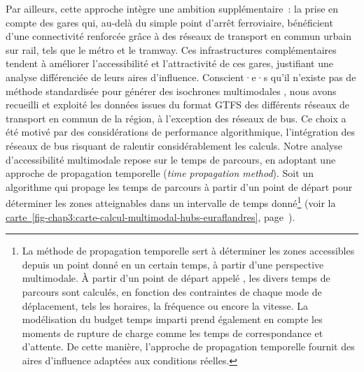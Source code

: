 \begin{refsegment}
Par ailleurs, cette approche intègre une ambition supplémentaire~: la prise en compte des gares qui, au-delà du simple point d'arrêt ferroviaire, bénéficient d’une connectivité renforcée grâce à des réseaux de transport en commun urbain sur rail, tels que le métro et le tramway. Ces infrastructures complémentaires tendent à améliorer l’accessibilité et l’attractivité de ces gares, justifiant une analyse différenciée de leurs aires d’influence. Conscient·e·s qu’il n’existe pas de méthode standardisée pour générer des isochrones multimodales \textcolor{blue}{\autocite[5]{krismer_enhancing_2017}}, nous avons recueilli et exploité les données issues du format \acrfull{GTFS} des différents réseaux de transport en commun de la région, à l’exception des réseaux de bus. Ce choix a été motivé par des considérations de performance algorithmique, l’intégration des réseaux de bus risquant de ralentir considérablement les calculs. Notre analyse d’accessibilité multimodale repose sur le temps de parcours, en adoptant une approche de propagation temporelle (\textsl{time propagation method}). Soit un algorithme qui propage les temps de parcours à partir d’un point de départ pour déterminer les zones atteignables dans un intervalle de temps donné\footnote{
    La méthode de propagation temporelle sert à déterminer les zones accessibles depuis un point donné en un certain temps, à partir d'une perspective multimodale. À partir d'un point de départ appelé , les divers temps de parcours sont calculés, en fonction des contraintes de chaque mode de déplacement, tels les horaires, la fréquence ou encore la vitesse. La modélisation du budget temps imparti prend également en compte les moments de rupture de charge comme les temps de correspondance et d'attente. De cette manière, l'approche de propagation temporelle fournit des aires d'influence adaptées aux conditions réelles.
} (voir la \hyperref[fig-chap3:carte-calcul-multimodal-hubs-euraflandres]{carte~\ref{fig-chap3:carte-calcul-multimodal-hubs-euraflandres}}, page~\pageref{fig-chap3:carte-calcul-multimodal-hubs-euraflandres}).%


\end{refsegment}
